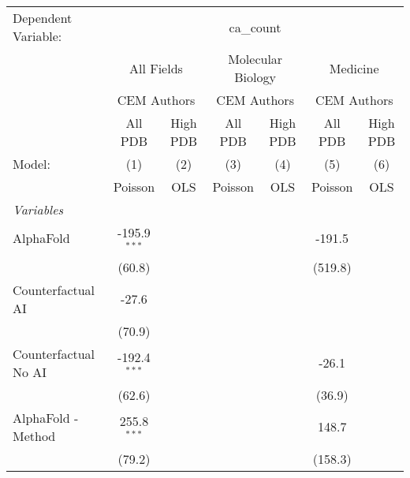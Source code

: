 \begingroup
\centering
\begin{tabular}{lcccccc}
   \tabularnewline \midrule \midrule
   Dependent Variable: & \multicolumn{6}{c}{ca\_count}\\
 & \multicolumn{2}{c}{All Fields} & \multicolumn{2}{c}{Molecular Biology} & \multicolumn{2}{c}{Medicine} \\
\cmidrule(lr){2-3} \cmidrule(lr){4-5} \cmidrule(lr){6-7}
 & \multicolumn{2}{c}{CEM Authors} & \multicolumn{2}{c}{CEM Authors} & \multicolumn{2}{c}{CEM Authors} \\
\cmidrule(lr){2-3} \cmidrule(lr){4-5} \cmidrule(lr){6-7}
 & \multicolumn{1}{c}{All PDB} & \multicolumn{1}{c}{High PDB} & \multicolumn{1}{c}{All PDB} & \multicolumn{1}{c}{High PDB} & \multicolumn{1}{c}{All PDB} & \multicolumn{1}{c}{High PDB} \\
\cmidrule(lr){2-2} \cmidrule(lr){3-3} \cmidrule(lr){4-4} \cmidrule(lr){5-5} \cmidrule(lr){6-6} \cmidrule(lr){7-7}
   Model:                                                     & (1)             & (2)  & (3)     & (4)  & (5)     & (6)\\  
                                                              &  Poisson        & OLS  & Poisson & OLS  & Poisson & OLS\\  
   \midrule
   \emph{Variables}\\
   AlphaFold                                                  & -195.9$^{***}$  &      &         &      & -191.5  &   \\   
                                                              & (60.8)          &      &         &      & (519.8) &   \\   
   Counterfactual AI                                          & -27.6           &      &         &      &         &   \\   
                                                              & (70.9)          &      &         &      &         &   \\   
   Counterfactual No AI                                       & -192.4$^{***}$  &      &         &      & -26.1   &   \\   
                                                              & (62.6)          &      &         &      & (36.9)  &   \\   
   AlphaFold - Method                                         & 255.8$^{***}$   &      &         &      & 148.7   &   \\   
                                                              & (79.2)          &      &         &      & (158.3) &   \\   

\end{tabular}
